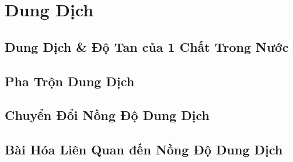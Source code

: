 \documentclass{article}
\numberwithin{equation}{section}
\begin{document}

\section{Dung Dịch}

\subsection{Dung Dịch \& Độ Tan của 1 Chất Trong Nước}


\subsection{Pha Trộn Dung Dịch}


\subsection{Chuyển Đổi Nồng Độ Dung Dịch}


\subsection{Bài Hóa Liên Quan đến Nồng Độ Dung Dịch}


\printbibliography[heading=bibintoc]
	
\end{document}

